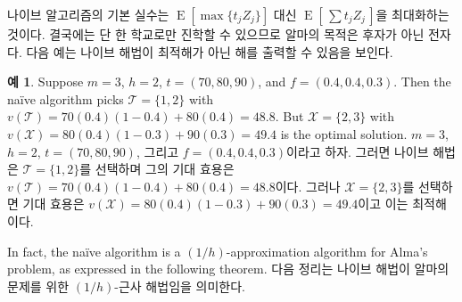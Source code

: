 \documentclass[11pt]{article} %
\theoremstyle{definition}
\newtheorem{example}{Example}
\theoremstyle{definition}
\newtheorem{example}{예}
\begin{document}
나이브 알고리즘의 기본 실수는 $\operatorname{E}\left[\max \{t_j Z_j\} \right]$ 대신  $\operatorname{E}\left[\,\sum t_j Z_j\,\right]$을 최대화하는 것이다. 결국에는 단 한 학교로만 진학할 수 있으므로 알마의 목적은 후자가 아닌 전자다. %
다음 예는 나이브 해법이 최적해가 아닌 해를 출력할 수 있음을 보인다.
\fi
\begin{example}
\ifen 
Suppose $m=3$, $h=2$,  $ t= (70, 80, 90) $, and $f = (0.4, 0.4, 0.3)$. 
Then the na\"ive algorithm picks $\mathcal{T} = \{1, 2\}$ with 
$v(\mathcal{T}) = 70(0.4)(1-0.4) + 80(0.4) = 48.8$.
But $\mathcal{X} = \{2, 3\}$ with
$v(\mathcal{X}) = 80(0.4)(1-0.3) + 90(0.3) = 49.4$
is the optimal solution. 
\else
$m=3$, $h=2$,  $ t= (70, 80, 90) $, 그리고 $f = (0.4, 0.4, 0.3)$이라고 하자. 그러면 나이브 해법은 $\mathcal{T} = \{1, 2\}$를 선택하며 그의 기대 효용은 $v(\mathcal{T}) = 70(0.4)(1-0.4) + 80(0.4) = 48.8$이다. 그러나 $\mathcal{X} = \{2, 3\}$를 선택하면 기대 효용은 $v(\mathcal{X}) = 80(0.4)(1-0.3) + 90(0.3) = 49.4$이고 이는 최적해이다.
\fi
\end{example}
\ifen
\noindent In fact, the na\"ive algorithm is a $(1/h)$-approximation algorithm for Alma’s problem, as expressed in the following theorem.
\else
\noindent 다음 정리는 나이브 해법이 알마의 문제를 위한 $(1/h)$-근사 해법임을 의미한다.
\fi
\end{document}
